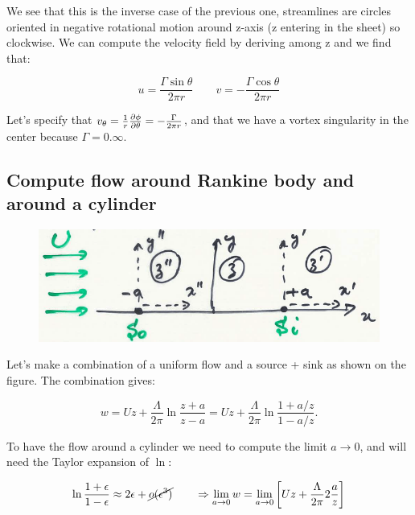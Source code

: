 \documentclass[british,french,11pt, a4paper, openany]{article}
\begin{document}
We see that this is the inverse case of the previous one, streamlines are circles oriented in negative rotational motion around z-axis (z entering in the sheet) so clockwise. We can compute the velocity field by deriving among z and we find that: 

\begin{equation}
u = \frac{\Gamma \sin \theta}{2 \pi r} \qquad v = -\frac{\Gamma \cos \theta}{2\pi r}
\end{equation}

Let's specify that $v_\theta = \frac{1}{r} \frac{\D \phi}{\D \theta} = -\frac{\Gamma}{2 \pi r}$, and that we have a vortex singularity in the center because $\Gamma = 0. \infty$.

\subsection{Compute flow around Rankine body and around a cylinder}

	\begin{figure}
	\vspace{-5mm}
	\includegraphics[scale=0.23]{ch2/27}
\end{figure}
Let's make a combination of a uniform flow and a source + sink as shown on the figure. The combination gives:

\begin{equation}
w = Uz + \frac{\Lambda}{2\pi} \ln \frac{z+a}{z-a}= Uz + \frac{\Lambda}{2\pi} \ln \frac{1+a/z}{1-a/z}.
\end{equation}

To have the flow around a cylinder we need to compute the limit $a\rightarrow 0$, and will need the Taylor expansion of $\ln$:

\begin{equation}
\ln \frac{1+\epsilon}{1-\epsilon} \approx 2 \epsilon + \cancel{o(\epsilon ^3)} \qquad \Rightarrow \lim _{a\rightarrow 0} w = \lim _{a \rightarrow 0} \left[ Uz + \frac{\Lambda}{2\pi} 2 \frac{a}{z} \right]
\end{equation}
\end{document}
